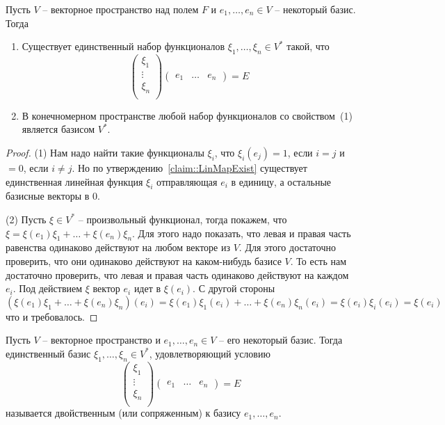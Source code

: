 \begin{claim}
\label{claim:DualBasis}
Пусть $V$ -- векторное пространство над полем $F$ и $e_1,\ldots,e_n\in V$ -- некоторый базис.
Тогда
\begin{enumerate}
\item Существует единственный набор функционалов $\xi_1,\ldots,\xi_n\in V^*$ такой, что 
\[
\begin{pmatrix}
{\xi_1}\\{\vdots}\\{\xi_n}\\
\end{pmatrix}
\begin{pmatrix}
{e_1}&{\ldots}&{e_n}
\end{pmatrix}
=
E
\]

\item В конечномерном пространстве любой набор функционалов со свойством~(1) является базисом $V^*$.
\end{enumerate}
\end{claim}
\begin{proof}
(1) Нам надо найти такие функционалы $\xi_i$, что $\xi_i(e_j) = 1$, если $i = j$ и $ = 0$, если $i\neq j$.
Но по утверждению~\ref{claim::LinMapExist} существует единственная линейная функция $\xi_i$ отправляющая $e_i$ в единицу, а остальные базисные векторы в $0$.

(2) Пусть $\xi \in V^*$ -- произвольный функционал, тогда покажем, что $\xi = \xi(e_1)\xi_1 + \ldots + \xi(e_n)\xi_n$.
Для этого надо показать, что левая и правая часть равенства одинаково действуют на любом векторе из $V$.
Для этого достаточно проверить, что они одинаково действуют на каком-нибудь базисе $V$.
То есть нам достаточно проверить, что левая и правая часть одинаково действуют на каждом $e_i$.
Под действием $\xi$ вектор $e_i$ идет в $\xi(e_i)$.
С другой стороны
\[
(\xi(e_1)\xi_1 + \ldots + \xi(e_n)\xi_n)(e_i) = \xi(e_1)\xi_1(e_i) + \ldots + \xi(e_n)\xi_n(e_i) = \xi(e_i)\xi_i(e_i) = \xi(e_i)
\]
что и требовалось.
\end{proof}

\begin{definition}
\label{def::DualBasis}
Пусть $V$ -- векторное пространство и $e_1,\ldots,e_n\in V$ -- его некоторый базис.
Тогда единственный базис $\xi_1,\ldots,\xi_n\in V^*$, удовлетворяющий условию
\[
\begin{pmatrix}
{\xi_1}\\{\vdots}\\{\xi_n}\\
\end{pmatrix}
\begin{pmatrix}
{e_1}&{\ldots}&{e_n}
\end{pmatrix}
=
E
\]
называется двойственным (или сопряженным) к базису $e_1,\ldots,e_n$.
\end{definition}

